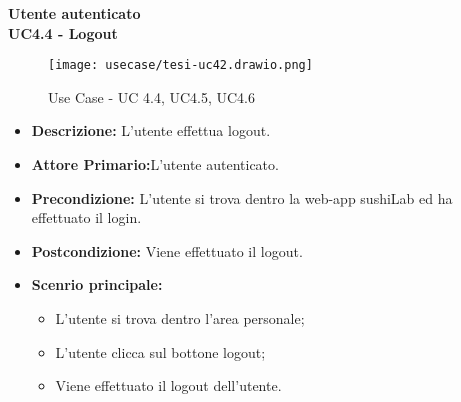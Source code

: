 \textbf{Utente autenticato}\\
\textbf{UC4.4 - Logout}
\begin{figure}[H]
    \centering
    \texttt{[image: usecase/tesi-uc42.drawio.png]}
    \caption{Use Case - UC 4.4, UC4.5, UC4.6}
\end{figure}
\begin{itemize}
    \item \textbf{Descrizione:} L'utente effettua logout.
    \item \textbf{Attore Primario:}L'utente autenticato.
    \item \textbf{Precondizione:} L'utente si trova dentro la web-app sushiLab ed ha effettuato il login.
    \item \textbf{Postcondizione:} Viene effettuato il logout.
    \item \textbf{Scenrio principale:}
    \begin{itemize}
        \item L'utente si trova dentro l'area personale;
        \item L'utente clicca sul bottone logout;
        \item Viene effettuato il logout dell'utente.
    \end{itemize}
\end{itemize}
